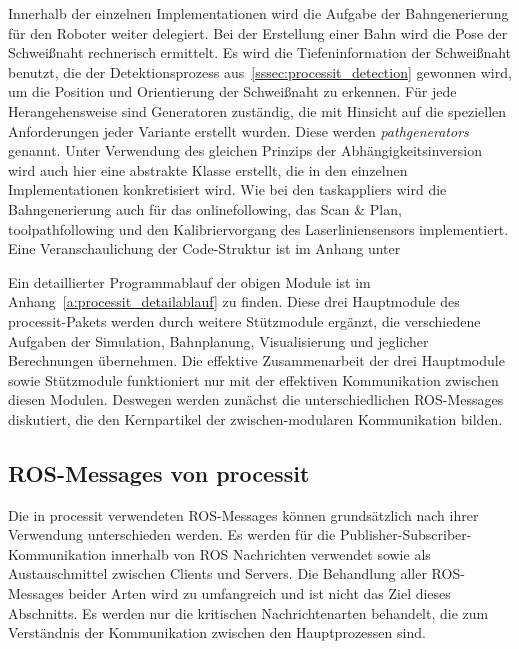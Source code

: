 Innerhalb der einzelnen Implementationen wird die Aufgabe der Bahngenerierung für den Roboter weiter delegiert. Bei der Erstellung einer Bahn wird die Pose der Schweißnaht rechnerisch ermittelt. Es wird die Tiefeninformation der Schweißnaht benutzt, die der Detektionsprozess aus~\ref{sssec:processit_detection} gewonnen wird, um die Position und Orientierung der Schweißnaht zu erkennen. Für jede Herangehensweise sind Generatoren zuständig, die mit Hinsicht auf die speziellen Anforderungen jeder Variante erstellt wurden. Diese werden \emph{path\textunderscore generators} genannt. Unter Verwendung des gleichen Prinzips der Abhängigkeitsinversion wird auch hier eine abstrakte Klasse erstellt, die in den einzelnen Implementationen konkretisiert wird. Wie bei den task\textunderscore appliers wird die Bahngenerierung auch für das online\textunderscore following, das Scan \& Plan, toolpath\textunderscore following und den Kalibriervorgang des Laserliniensensors implementiert. Eine Veranschaulichung der Code-Struktur ist im Anhang unter %

Ein detaillierter Programmablauf der obigen Module ist im Anhang~\ref{a:processit_detailablauf} zu finden. Diese drei Hauptmodule des processit-Pakets werden durch weitere Stützmodule ergänzt, die verschiedene Aufgaben der Simulation, Bahnplanung, Visualisierung und jeglicher Berechnungen übernehmen. Die effektive Zusammenarbeit der drei Hauptmodule sowie Stützmodule funktioniert nur mit der effektiven Kommunikation zwischen diesen Modulen. Deswegen werden zunächst die unterschiedlichen ROS-Messages diskutiert, die den Kernpartikel der zwischen-modularen Kommunikation bilden.


\subsection{ROS-Messages von processit}
Die in processit verwendeten ROS-Messages können grundsätzlich nach ihrer Verwendung unterschieden werden. Es werden für die Publisher-Subscriber-Kommunikation innerhalb von ROS Nachrichten verwendet sowie als Austauschmittel zwischen Clients und Servers. Die Behandlung aller ROS-Messages beider Arten wird zu umfangreich und ist nicht das Ziel dieses Abschnitts. Es werden nur die kritischen Nachrichtenarten behandelt, die zum Verständnis der Kommunikation zwischen den Hauptprozessen sind. 

